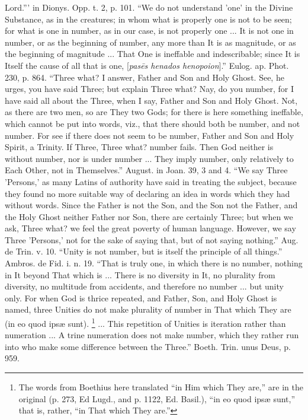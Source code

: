 Lord.''' in Dionys. Opp. t. 2, p. 101. ``We do not understand 'one' in
the Divine Substance, as in the creatures; in whom what is properly
one is not to be seen; for what is one in number, as in our case, is
not properly one ... It is not one in number, or as the beginning of
number, any more than It is as magnitude, or as the beginning of
magnitude ... That One is ineffable and indescribable; since It is
Itself the cause of all that is one, [\emph{pas\={e}s henados
henopoion}].'' Eulog. ap. Phot. 230, p. 864. ``Three what? I answer,
Father and Son and Holy Ghost. See, he urges, you have said Three; but
explain Three what? Nay, do you number, for I have said all about the
Three, when I say, Father and Son and Holy Ghost. Not, as there are
two men, so are They two Gods; for there is here something ineffable,
which cannot be put into words, viz., that there should both be
number, and not number. For see if there does not seem to be number,
Father and Son and Holy Spirit, a Trinity. If Three, Three what?
number fails. Then God neither is without number, nor is under number
... They imply number, only relatively to Each Other, not in
Themselves.'' August. in Joan. 39, 3 and 4. ``We say Three 'Persons,' as
many Latins of authority have said in treating the subject, because
they found no more suitable way of declaring an idea in words which
they had without words. Since the Father is not the Son, and the
Son not the Father, and the Holy Ghost neither Father nor Son, there
are certainly Three; but when we ask, Three what? we feel the great
poverty of human language. However, we say Three 'Persons,' not for
the sake of saying that, but of not saying nothing.'' Aug. de Trin. v.
10. ``Unity is not number, but is itself the principle of all things.''
Ambros. de Fid. i. n. 19. ``That is truly one, in which there is no
number, nothing in It beyond That which is ... There is no diversity
in It, no plurality from diversity, no multitude from accidents, and
therefore no number ... but unity only. For when God is thrice
repeated, and Father, Son, and Holy Ghost is named, three Unities do
not make plurality of number in That which They are (in eo quod ipsæ
sunt). \footnote{The words from Boethius here translated ``in Him
which They are,'' are in the original (p. 273, Ed Lugd., and p. 1122,
Ed. Basil.), ``in eo quod ipsæ sunt,'' that is, rather, ``in That which
They are.''} ... This repetition
of Unities is iteration rather than numeration ... A trine numeration
does not make number, which they rather run into who make some
difference between the Three.'' Boeth. Trin. unus Deus, p. 959.


